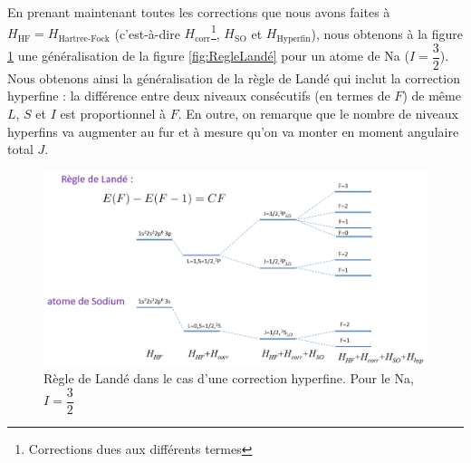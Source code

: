En prenant maintenant toutes les corrections que nous avons faites à $H_\text{HF}=H_\text{Hartree-Fock}$ (c'est-à-dire $H_\text{corr}$\footnote{Corrections dues aux différents termes}, $H_\text{SO}$ et $H_\text{Hyperfin}$), nous obtenons à la figure \ref{fig:regle_lande2} une généralisation de la figure \ref{fig:RegleLandé} pour un atome de Na ($I=\dfrac{3}{2}$). Nous obtenons ainsi la généralisation de la règle de Landé qui inclut la correction hyperfine : la différence entre deux niveaux consécutifs (en termes de $F$) de même $L$, $S$ et $I$ est proportionnel à $F$.
En outre, on remarque que le nombre de niveaux hyperfins va augmenter au fur et à mesure qu'on va monter en moment angulaire total $J$.
\begin{figure}[htp]
    \centering
    \includegraphics[scale=0.8]{Images2/règle_Landé2.png}
    \caption{Règle de Landé dans le cas d'une correction hyperfine. Pour le Na, $I=\dfrac{3}{2}$}
    \label{fig:regle_lande2}
\end{figure}


